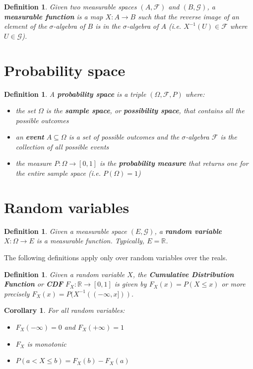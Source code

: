 \documentclass{article}
\newtheorem{defn}[equation]{Definition}
\newtheorem{coro}[equation]{Corollary}
\begin{document}
\begin{defn}
	Given two measurable spaces $(A, \mathcal{F})$ and $(B, \mathcal{G})$, a \textbf{measurable function} is a map $X : A \to B$ such that the reverse image of an element of the $\sigma$-algebra of $B$ is in the $\sigma$-algebra of $A$ (i.e. $X^{-1}(U) \in \mathcal{F}$ where $U \in \mathcal{G}$).
\end{defn}

\section{Probability space}

\begin{defn}
	A \textbf{probability space} is a triple $(\Omega, \mathcal{F}, P)$ where:
	\begin{itemize}
		\item the set $\Omega$ is the \textbf{sample space}, or \textbf{possibility space}, that contains all the possible outcomes
		\item an \textbf{event} $A \subseteq \Omega$ is a set of possible outcomes and the $\sigma$-algebra $\mathcal{F}$ is the collection of all possible events
		\item the measure $P : \Omega \to [0,1]$ is the \textbf{probability measure} that returns one for the entire sample space (i.e. $P(\Omega) = 1$)
	\end{itemize}
\end{defn}

\section{Random variables}

\begin{defn}
	Given a measurable space $(E, \mathcal{G})$, a \textbf{random variable} $X : \Omega \to E$ is a measurable function. Typically, $E = \mathbb{R}$.
\end{defn}

The following definitions apply only over random variables over the reals.

\begin{defn}
	Given a random variable $X$, the \textbf{Cumulative Distribution Function} or \textbf{CDF} $F_X : \mathbb{R} \to [0,1]$ is given by $F_X(x) = P(X \leq x)$ or more precisely $F_X(x) = P(X^{-1}( (-\infty, x] ))$.
\end{defn}

\begin{coro}
	For all random variables:
	\begin{itemize}
		\item $F_X(-\infty) = 0$ and $F_X(+\infty) = 1$
		\item $F_X$ is monotonic
		\item $P(a < X \leq b) = F_X(b) - F_X(a)$ 
	\end{itemize} 
\end{coro}
\end{document}
